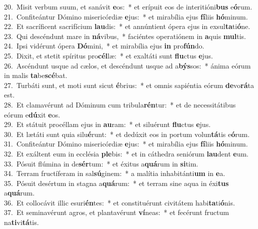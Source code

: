 {20.~}Misit verbum suum, et sanávit \textbf{e}os:~* et erípuit eos de interitióni\textbf{bus} e\textbf{ó}rum.\\
{21.~}Confiteántur Dómino misericórdiæ \textbf{e}jus:~* et mirabília ejus \textbf{fí}liis \textbf{hó}minum.\\
{22.~}Et sacríficent sacrifícium \textbf{lau}dis:~* et annúntient ópera ejus in exsul\textbf{ta}ti\textbf{ó}ne.\\
{23.~}Qui descéndunt mare in \textbf{ná}vibus,~* faciéntes operatiónem in \textbf{a}quis \textbf{mul}tis.\\
{24.~}Ipsi vidérunt ópera \textbf{Dó}mini,~* et mirabília ejus \textbf{in} pro\textbf{fún}do.\\
{25.~}Dixit, et stetit spíritus pro\textbf{cél}læ:~* et exaltáti sunt \textbf{flu}ctus \textbf{e}jus.\\
{26.~}Ascéndunt usque ad cælos, et descéndunt usque ad a\textbf{býs}sos:~* ánima eórum in malis \textbf{ta}be\textbf{scé}bat.\\
{27.~}Turbáti sunt, et moti sunt sicut \textbf{é}brius:~* et omnis sapiéntia eórum \textbf{de}vo\textbf{rá}ta est.\\
{28.~}Et clamavérunt ad Dóminum cum tribula\textbf{rén}tur:~* et de necessitátibus eórum e\textbf{dú}xit \textbf{e}os.\\
{29.~}Et státuit procéllam ejus in \textbf{au}ram:~* et siluérunt \textbf{flu}ctus \textbf{e}jus.\\
{30.~}Et lætáti sunt quia silu\textbf{é}runt:~* et dedúxit eos in portum volun\textbf{tá}tis e\textbf{ó}rum.\\
{31.~}Confiteántur Dómino misericórdiæ \textbf{e}jus:~* et mirabília ejus \textbf{fí}liis \textbf{hó}minum.\\
{32.~}Et exáltent eum in ecclésia \textbf{ple}bis:~* et in cáthedra seniórum \textbf{lau}dent \textbf{e}um.\\
{33.~}Pósuit flúmina in de\textbf{sér}tum:~* et éxitus a\textbf{quá}rum in \textbf{si}tim.\\
{34.~}Terram fructíferam in sal\textbf{sú}ginem:~* a malítia inhabitánti\textbf{um} in \textbf{e}a.\\
{35.~}Pósuit desértum in stagna a\textbf{quá}rum:~* et terram sine aqua in éxi\textbf{tus} a\textbf{quá}rum.\\
{36.~}Et collocávit illic esuri\textbf{én}tes:~* et constituérunt civitátem habi\textbf{ta}ti\textbf{ó}nis.\\
{37.~}Et seminavérunt agros, et plantavérunt \textbf{ví}neas:~* et fecérunt fructum na\textbf{ti}vi\textbf{tá}tis.\\
